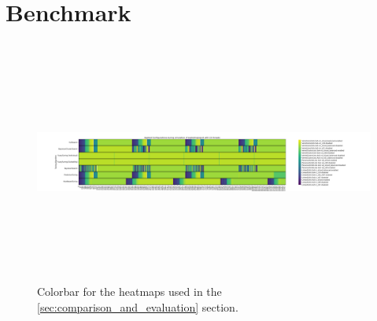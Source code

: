\section{Benchmark}

\begin{figure}[H]
  \includegraphics[height=8cm,trim={54cm 0 5cm 0cm},clip]{figures/Benchmark/colorbar_explodingLiquid.png}
  \caption{
      Colorbar for the heatmaps used in the \ref{sec:comparison_and_evaluation} section.
  }
  \label{fig:colorbar_explodingLiquid}
\end{figure}
